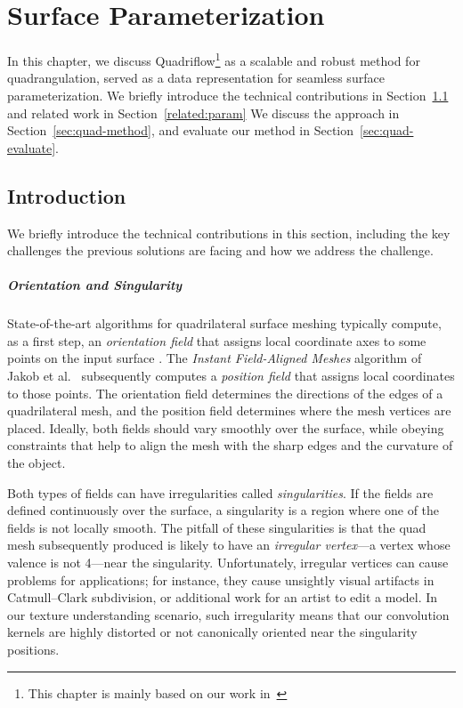 \chapter{Surface Parameterization}
\label{chapter:param}
In this chapter, we discuss Quadriflow\footnote{This chapter is mainly based on our work in~\cite{huang2018quadriflow}} as a scalable and robust method for quadrangulation, served as a data representation for seamless surface parameterization.
%
We briefly introduce the technical contributions in Section~\ref{sec:param-intro} and related work in Section~\ref{related:param}
%
We discuss the approach in Section~\ref{sec:quad-method}, and evaluate our method in Section~\ref{sec:quad-evaluate}.

\section{Introduction}
\label{sec:param-intro}
We briefly introduce the technical contributions in this section, including the key challenges the previous solutions are facing and how we address the challenge.

\paragraph*{Orientation and Singularity} State-of-the-art algorithms for quadrilateral surface meshing typically compute, as a first step, an \emph{orientation field} that assigns local coordinate axes to some points on the input surface \cite{knupp1995mesh,ray2006periodic,kalberer2007quadcover,bommes2009mixed}. The {\em Instant Field-Aligned Meshes} \mbox{algorithm} of Jakob et al.~\cite{jakob2015instant} subsequently computes a \emph{position field} that assigns local coordinates %
to those points. The orientation field determines the directions of the edges of a quadrilateral mesh, and the position field determines where the mesh vertices are placed. Ideally, both fields should vary smoothly over the surface, while obeying constraints that help to align the mesh with the sharp edges and the curvature of the object.

Both types of fields can have irregularities called \emph{singularities}. If the fields are defined continuously over the surface, a singularity is a region where one of the fields is not locally smooth.
The pitfall of these singularities is that the quad mesh subsequently produced is likely to have an \emph{irregular vertex}---a vertex whose valence is not 4---near the singularity. 
Unfortunately, irregular vertices can cause problems for applications; for instance, they cause unsightly visual artifacts in Catmull--Clark subdivision, or additional work for an artist to edit a model. In our texture understanding scenario, such irregularity means that our convolution kernels are highly distorted or not canonically oriented near the singularity positions.

